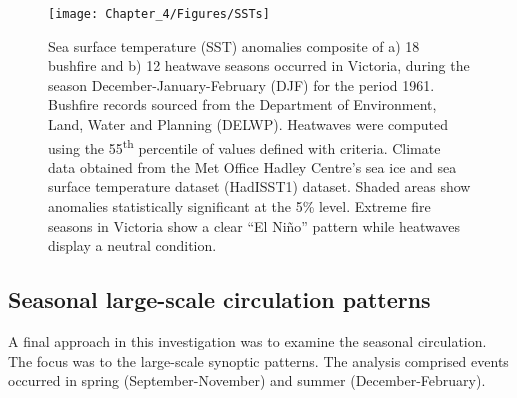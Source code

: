 \begin{figure}[h]
\noindent \begin{centering}
\texttt{[image: Chapter\_4/Figures/SSTs]}
\par\end{centering}

\caption[Sea surface temperature (SST) anomalies composite of a) 18 bushfire
and b) 12 heatwave seasons occurred in Victoria, during the season December-January-February
(DJF) for the period 1961]{Sea surface temperature (SST) anomalies composite of a) 18 bushfire
and b) 12 heatwave seasons occurred in Victoria, during the season December-January-February
(DJF) for the period 1961. Bushfire records sourced
from the Department of Environment, Land, Water and Planning (DELWP).
Heatwaves were computed using the 55\protect\textsuperscript{th}
percentile of values defined with \citet{Nairn2009} criteria. Climate
data obtained from the Met Office Hadley Centre\textquoteright s sea
ice and sea surface temperature dataset (HadISST1) dataset. Shaded
areas show anomalies statistically significant at the 5\% level. Extreme
fire seasons in Victoria show a clear ``El Ni\~no'' pattern while
heatwaves display a neutral condition. \label{fig:Sea surface temperature anomalies of bushfire and heatwave seasons in December-January-February for the period 1961=0020132011}}


\end{figure}



\subsection{Seasonal large-scale circulation patterns }

A final approach in this investigation was to examine the seasonal
circulation. The focus was to the large-scale synoptic patterns. The
analysis comprised events occurred in spring (September-November)
and summer (December-February). 

